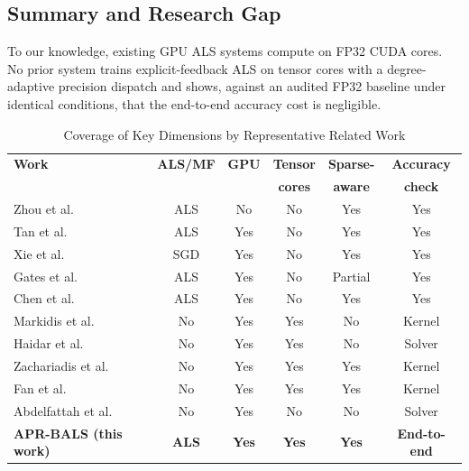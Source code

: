 \subsection{Summary and Research Gap}

To our knowledge, existing GPU ALS systems compute on FP32 CUDA cores. No prior system trains explicit-feedback ALS on tensor cores with a degree-adaptive precision dispatch and shows, against an audited FP32 baseline under identical conditions, that the end-to-end accuracy cost is negligible.

\begin{table}[!t]
\caption{Coverage of Key Dimensions by Representative Related Work}
\label{tab:litgap}
\centering
\footnotesize
\renewcommand{\arraystretch}{1.15}
\setlength{\tabcolsep}{2.2pt}
\begin{tabular}{lccccc}
\toprule
\textbf{Work} & \textbf{ALS/MF} & \textbf{GPU} & \textbf{Tensor} & \textbf{Sparse-} & \textbf{Accuracy} \\
 & & & \textbf{cores} & \textbf{aware} & \textbf{check} \\
\midrule
Zhou et al.~\cite{zhou2008largescale}            & ALS    & No  & No  & Yes & Yes \\
Tan et al.~\cite{tan2016faster}                  & ALS    & Yes & No  & Yes & Yes \\
Xie et al.~\cite{xie2017cumf}                    & SGD    & Yes & No  & Yes & Yes \\
Gates et al.~\cite{gates2015accelerating}        & ALS    & Yes & No  & Partial & Yes \\
Chen et al.~\cite{chen2021bals}                  & ALS    & Yes & No  & Yes & Yes \\
Markidis et al.~\cite{markidis2018nvidia}        & No     & Yes & Yes & No  & Kernel \\
Haidar et al.~\cite{haidar2018harnessing}        & No     & Yes & Yes & No  & Solver \\
Zachariadis et al.~\cite{zachariadis2020accelerating} & No & Yes & Yes & Yes & Kernel \\
Fan et al.~\cite{fan2024dtcspmm}                 & No     & Yes & Yes & Yes & Kernel \\
Abdelfattah et al.~\cite{abdelfattah2017factorization} & No & Yes & No & No & Solver \\
\midrule
\textbf{APR-BALS (this work)} & \textbf{ALS} & \textbf{Yes} & \textbf{Yes} & \textbf{Yes} & \textbf{End-to-end} \\
\bottomrule
\end{tabular}
\end{table}
